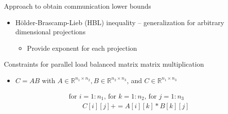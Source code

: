 \documentclass[aspectratio=169]{beamer}
\begin{document}
\begin{frame}{Approach to obtain communication lower bounds}
{\begin{minipage}{0.25\linewidth}
\begin{center}
			\end{center}
		\end{minipage}
		\begin{itemize}
			\item H\"{o}lder-Brascamp-Lieb (HBL) inequality -- generalization for arbitrary dimensional projections
			\begin{itemize}
				\item Provide exponent for each projection
			\end{itemize}
		\end{itemize}
		\vspace*{-0.15cm}
		\begin{block}{\small Constraints for parallel load balanced matrix matrix multiplication}
			\begin{itemize}
				\item $C=AB$ with $A \in \mathbb{R}^{n_1\times n_2}, B \in \mathbb{R}^{n_2\times n_3}$, and $C \in \mathbb{R}^{n_1\times n_3}$
			\end{itemize}
			\vspace*{-0.45cm}\begin{align*}
			&\text{for $i = 1{:}n_1$, for $k = 1{:}n_2$, for $j = 1{:}n_3$}\\
			&\quad \quad C[i][j] += A[i][k]*B[k][j]
			\end{align*}

\end{block}}
\end{frame}
\end{document}
